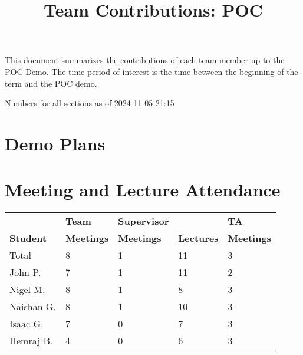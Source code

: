 \documentclass{article}
\title{Team Contributions: POC\\\progname}
\author{\authname}
\date{}
\begin{document}
\maketitle

This document summarizes the contributions of each team member up to the POC
Demo.  The time period of interest is the time between the beginning of the term
and the POC demo.

Numbers for all sections as of 2024-11-05 21:15

\section{Demo Plans}


\section{Meeting and Lecture Attendance}





\begin{table}[H]
\centering
\begin{tabular}{lllll}
\toprule
\textbf{ } & \textbf{Team} & \textbf{Supervisor} & \textbf{ } & \textbf{TA}\\
\textbf{Student} & \textbf{Meetings} & \textbf{Meetings} & \textbf{Lectures} & \textbf{Meetings}\\
\midrule
Total & 8 & 1 & 11 & 3\\
\midrule
John P. & 7 & 1 & 11 & 2\\
Nigel M. & 8 & 1 & 8 & 3\\
Naishan G. & 8 & 1 & 10 & 3\\
Isaac G. & 7 & 0 & 7 & 3\\
Hemraj B. & 4 & 0 & 6 & 3\\
\bottomrule
\end{tabular}
\end{table}
\end{document}
